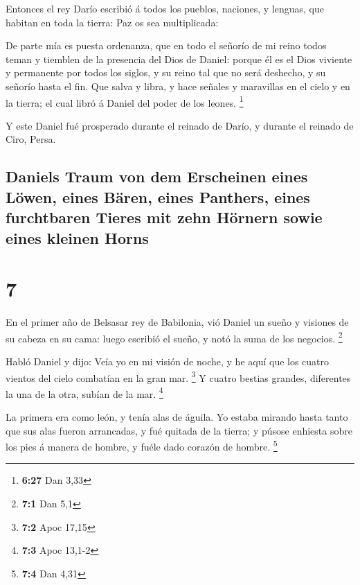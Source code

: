  Entonces el rey Darío escribió á todos los pueblos,
naciones, y lenguas, que habitan en toda la tierra: Paz os sea
multiplicada:

 De parte mía es puesta ordenanza, que en todo el señorío
de mi reino todos teman y tiemblen de la presencia del Dios de Daniel:
porque él es el Dios viviente y permanente por todos los siglos, y su
reino tal que no será deshecho, y su señorío hasta el fin.
 Que salva y libra, y hace señales y maravillas en el
cielo y en la tierra; el cual libró á Daniel del poder de los leones.
\footnote{\textbf{6:27} Dan 3,33}

 Y este Daniel fué prosperado durante el reinado de
Darío, y durante el reinado de Ciro, Persa.

\hypertarget{daniels-traum-von-dem-erscheinen-eines-luxf6wen-eines-buxe4ren-eines-panthers-eines-furchtbaren-tieres-mit-zehn-huxf6rnern-sowie-eines-kleinen-horns}{%
\subsection{Daniels Traum von dem Erscheinen eines Löwen, eines Bären,
eines Panthers, eines furchtbaren Tieres mit zehn Hörnern sowie eines
kleinen
Horns}\label{daniels-traum-von-dem-erscheinen-eines-luxf6wen-eines-buxe4ren-eines-panthers-eines-furchtbaren-tieres-mit-zehn-huxf6rnern-sowie-eines-kleinen-horns}}

\hypertarget{section-6}{%
\section{7}\label{section-6}}

 En el primer año de Belsasar rey de Babilonia, vió Daniel
un sueño y visiones de su cabeza en su cama: luego escribió el sueño, y
notó la suma de los negocios. \footnote{\textbf{7:1} Dan 5,1}

 Habló Daniel y dijo: Veía yo en mi visión de noche, y he
aquí que los cuatro vientos del cielo combatían en la gran mar.
\footnote{\textbf{7:2} Apoc 17,15}  Y cuatro bestias
grandes, diferentes la una de la otra, subían de la mar. \footnote{\textbf{7:3}
  Apoc 13,1-2}

 La primera era como león, y tenía alas de águila. Yo
estaba mirando hasta tanto que sus alas fueron arrancadas, y fué quitada
de la tierra; y púsose enhiesta sobre los pies á manera de hombre, y
fuéle dado corazón de hombre. \footnote{\textbf{7:4} Dan 4,31}

